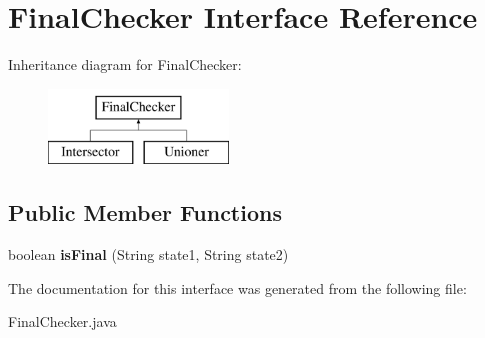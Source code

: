 \hypertarget{interface_final_checker}{}\section{Final\+Checker Interface Reference}
\label{interface_final_checker}
Inheritance diagram for Final\+Checker\+:\begin{figure}[H]
\begin{center}
\leavevmode
\includegraphics[height=2.000000cm]{interface_final_checker}
\end{center}
\end{figure}
\subsection*{Public Member Functions}
\begin{DoxyCompactItemize}
\item 
\mbox{\label{interface_final_checker_a7c885d546786b5ec1810ef7594f2af3d}} 
boolean {\bfseries is\+Final} (String state1, String state2)
\end{DoxyCompactItemize}


The documentation for this interface was generated from the following file\+:\begin{DoxyCompactItemize}
\item 
Final\+Checker.\+java\end{DoxyCompactItemize}
